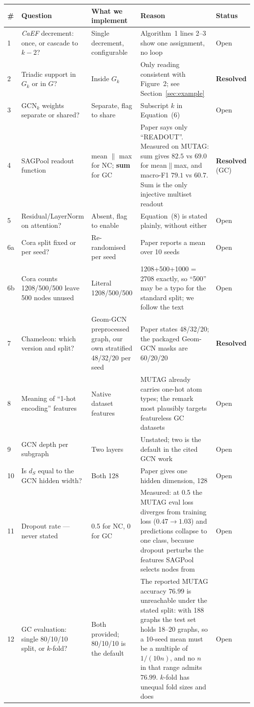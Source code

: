 \documentclass[11pt,a4paper]{article}
\newcommand{\caef}{\textit{CaEF}}
\begin{document}
\begin{center}\small
\begin{tabular}{@{}p{0.5cm}p{3.1cm}p{4.3cm}p{4.6cm}p{1.6cm}@{}}
\toprule
\# & Question & What we implement & Reason & Status \\
\midrule
1 & \caef{} decrement: once, or cascade to $k-2$? & Single decrement, configurable & Algorithm~1 lines 2--3 show one assignment, no loop & Open \\
2 & Triadic support in $G_k$ or in $G$? & Inside $G_k$ & Only reading consistent with Figure~2; see Section~\ref{sec:example} & \textbf{Resolved} \\
3 & $\mathrm{GCN}_k$ weights separate or shared? & Separate, flag to share & Subscript $k$ in Equation~(6) & Open \\
4 & SAGPool readout function & mean $\|$ max for NC; \textbf{sum} for GC & Paper says only ``READOUT''. Measured on MUTAG: sum gives $82.5$ vs $69.0$ for mean$\|$max, and macro-F1 $79.1$ vs $60.7$. Sum is the only injective multiset readout & \textbf{Resolved} (GC) \\
5 & Residual/LayerNorm on attention? & Absent, flag to enable & Equation~(8) is stated plainly, without either & Open \\
6a & Cora split fixed or per seed? & Re-randomised per seed & Paper reports a mean over 10 seeds & Open \\
6b & Cora counts 1208/500/500 leave 500 nodes unused & Literal 1208/500/500 & 1208+500+1000 = 2708 exactly, so ``500'' may be a typo for the standard split; we follow the text & Open \\
7 & Chameleon: which version and split? & Geom-GCN preprocessed graph, our own stratified 48/32/20 per seed & Paper states 48/32/20; the packaged Geom-GCN masks are 60/20/20 & \textbf{Resolved} \\
8 & Meaning of ``1-hot encoding'' features & Native dataset features & MUTAG already carries one-hot atom types; the remark most plausibly targets featureless GC datasets & Open \\
9 & GCN depth per subgraph & Two layers & Unstated; two is the default in the cited GCN work & Open \\
10 & Is $d_S$ equal to the GCN hidden width? & Both 128 & Paper gives one hidden dimension, 128 & Open \\
11 & Dropout rate --- never stated & 0.5 for NC, 0 for GC & Measured: at 0.5 the MUTAG eval loss diverges from training loss ($0.47 \rightarrow 1.03$) and predictions collapse to one class, because dropout perturbs the features SAGPool selects nodes from & Open \\
12 & GC evaluation: single 80/10/10 split, or $k$-fold? & Both provided; 80/10/10 is the default & The reported MUTAG accuracy $76.99$ is unreachable under the stated split: with 188 graphs the test set holds 18--20 graphs, so a 10-seed mean must be a multiple of $1/(10n)$, and no $n$ in that range admits $76.99$. $k$-fold has unequal fold sizes and does & Open \\
\bottomrule
\end{tabular}


\end{center}
\end{document}
